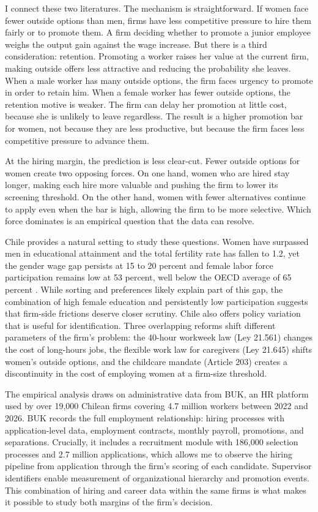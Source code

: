\documentclass[11pt]{article}
\begin{document}
I connect these two literatures. The mechanism is straightforward. If women face fewer outside options than men, firms have less competitive pressure to hire them fairly or to promote them. A firm deciding whether to promote a junior employee weighs the output gain against the wage increase. But there is a third consideration: retention. Promoting a worker raises her value at the current firm, making outside offers less attractive and reducing the probability she leaves. When a male worker has many outside options, the firm faces urgency to promote in order to retain him. When a female worker has fewer outside options, the retention motive is weaker. The firm can delay her promotion at little cost, because she is unlikely to leave regardless. The result is a higher promotion bar for women, not because they are less productive, but because the firm faces less competitive pressure to advance them.

At the hiring margin, the prediction is less clear-cut. Fewer outside options for women create two opposing forces. On one hand, women who are hired stay longer, making each hire more valuable and pushing the firm to lower its screening threshold. On the other hand, women with fewer alternatives continue to apply even when the bar is high, allowing the firm to be more selective. Which force dominates is an empirical question that the data can resolve.

Chile provides a natural setting to study these questions. Women have surpassed men in educational attainment and the total fertility rate has fallen to 1.2, yet the gender wage gap persists at 15 to 20 percent and female labor force participation remains low at 53 percent, well below the OECD average of 65 percent \citep{oecd_employment_2024, ine_genero_2024}. While sorting and preferences likely explain part of this gap, the combination of high female education and persistently low participation suggests that firm-side frictions deserve closer scrutiny. Chile also offers policy variation that is useful for identification. Three overlapping reforms shift different parameters of the firm's problem: the 40-hour workweek law (Ley 21.561) changes the cost of long-hours jobs, the flexible work law for caregivers (Ley 21.645) shifts women's outside options, and the childcare mandate (Article 203) creates a discontinuity in the cost of employing women at a firm-size threshold.

The empirical analysis draws on administrative data from BUK, an HR platform used by over 19,000 Chilean firms covering 4.7 million workers between 2022 and 2026. BUK records the full employment relationship: hiring processes with application-level data, employment contracts, monthly payroll, promotions, and separations. Crucially, it includes a recruitment module with 186,000 selection processes and 2.7 million applications, which allows me to observe the hiring pipeline from application through the firm's scoring of each candidate. Supervisor identifiers enable measurement of organizational hierarchy and promotion events. This combination of hiring and career data within the same firms is what makes it possible to study both margins of the firm's decision.
\end{document}
